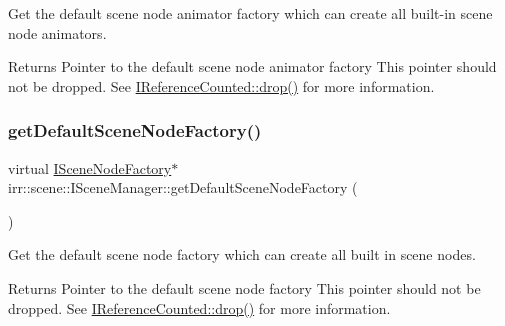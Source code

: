 Get the default scene node animator factory which can create all built-\/in scene node animators. 

\begin{DoxyReturn}{Returns}
Pointer to the default scene node animator factory This pointer should not be dropped. See \hyperlink{classirr_1_1IReferenceCounted_a03856a09355b89d178090c4a5f738543}{I\+Reference\+Counted\+::drop()} for more information. 
\end{DoxyReturn}
\mbox{\label{classirr_1_1scene_1_1ISceneManager_a1ea0ec7ec95a97819f1de5222b97e774}} 
\subsubsection{\texorpdfstring{get\+Default\+Scene\+Node\+Factory()}{getDefaultSceneNodeFactory()}\hspace{0.1cm}{\footnotesize\ttfamily [1/2]}}
{\footnotesize\ttfamily virtual \hyperlink{classirr_1_1scene_1_1ISceneNodeFactory}{I\+Scene\+Node\+Factory}$\ast$ irr\+::scene\+::\+I\+Scene\+Manager\+::get\+Default\+Scene\+Node\+Factory (\begin{DoxyParamCaption}{ }\end{DoxyParamCaption})\hspace{0.3cm}{\ttfamily [pure virtual]}}



Get the default scene node factory which can create all built in scene nodes. 

\begin{DoxyReturn}{Returns}
Pointer to the default scene node factory This pointer should not be dropped. See \hyperlink{classirr_1_1IReferenceCounted_a03856a09355b89d178090c4a5f738543}{I\+Reference\+Counted\+::drop()} for more information. 
\end{DoxyReturn}
\mbox{\label{classirr_1_1scene_1_1ISceneManager_a1ea0ec7ec95a97819f1de5222b97e774}} 
